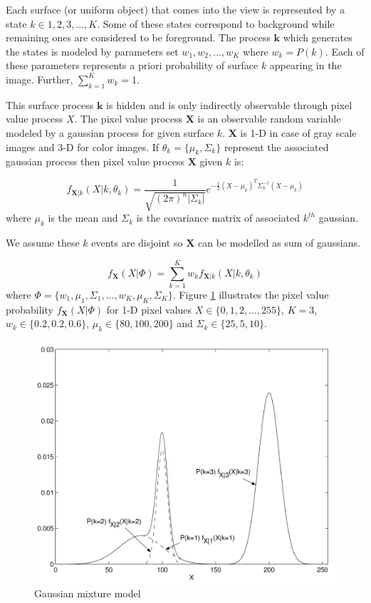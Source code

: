Each surface (or uniform object) that comes into the view is represented by a state $k \in {1,2,3,...,K}$. Some of these states correspond to  background while remaining ones are considered to be foreground. The process  $\mathbf{k}$ which generates the states is modeled by parameters set ${w_1, w_2, ..., w_K}$ where $w_k = P(k)$. Each of these parameters represents  a priori probability of surface $k$ appearing in the image. Further, $\sum_{k=1}^K w_k=1$. 

This surface process $\mathbf{k}$ is hidden and is only indirectly observable through pixel value process $X$. The pixel value process $\mathbf{X}$ is an observable random variable modeled by a gaussian process for given surface $k$. $\mathbf{X}$ is 1-D in case of gray scale images and 3-D for color images.  If $\theta_k= \{\mu_k, \Sigma_k \}$  represent the associated gaussian process then pixel value process $\mathbf{X}$ given $k$ is: 

$$ f_{\mathbf{X}|k}(X|k,\theta_k)=\frac{1}{\sqrt{(2\pi)^n |\Sigma_k |}}e^{-\frac{1}{2}(X-\mu_k)^T \Sigma_k^{-1} (X-\mu_k)} $$
where $\mu_k$ is the mean and $\Sigma_k$ is the covariance matrix of associated $k^{th}$ gaussian. 

We assume these $k$ events are disjoint so $\mathbf{X}$ can be modelled as sum of gaussians. 

$$ f_{\mathbf{X}}(X|\Phi)=\sum_{k=1}^K w_k f_{\mathbf{X}|k}(X|k,\theta_k)  $$
where $ \Phi = \{w_1, \mu_1, \Sigma_1,..., w_K, \mu_K, \Sigma_K \}$. Figure \ref{fig:gaussian-mixture-model} illustrates the pixel value probability $f_{\mathbf{X}}(X|\Phi)$  for 1-D pixel values $X \in \{ 0, 1, 2, ..., 255 \}$, $K=3$, $w_k \in \{ 0.2, 0.2, 0.6\}$,  $\mu_k \in \{ 80,100, 200\}$ and  $\Sigma_k \in \{ 25,5,10\}$.    

\begin{figure}
    \centering
    \includegraphics[width=\linewidth]{images/gaussian-mixture-model.png}
    \caption[Gaussian mixture model]{Gaussian mixture model\cite{power2002understanding}}
    \label{fig:gaussian-mixture-model}
\end{figure}

